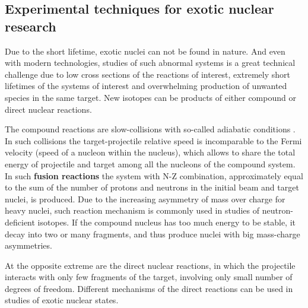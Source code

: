 \subsection{Experimental techniques for exotic nuclear research}

Due to the short lifetime, exotic nuclei can not be found in nature.
And even with modern technologies, studies of such abnormal systems is a great technical challenge due to low cross sections of the reactions of interest, extremely short lifetimes of the systems of interest and overwhelming production of unwanted species in the same target.
New isotopes can be products of either compound or direct nuclear reactions.

The compound reactions are slow-collisions with so-called adiabatic conditions \cite{Zagrebaev:2019}.
In such collisions the target-projectile relative speed is incomparable to the Fermi velocity (speed of a nucleon within the nucleus), which allows to share the total energy of projectile and target among all the nucleons of the compound system.
In such \textbf{fusion reactions} the system with N-Z combination, approximately equal to the sum of the number of protons and neutrons in the initial beam and target nuclei, is produced.
Due to the increasing asymmetry of mass over charge for heavy nuclei, such reaction mechanism is commonly used in studies of neutron-deficient isotopes.
If the compound nucleus has too much energy to be stable, it decay into two or many fragments, and thus produce nuclei with big mass-charge asymmetries.

At the opposite extreme are the direct nuclear reactions, in which the projectile interacts with only few fragments of the target, involving only small number of degrees of freedom.
Different mechanisms of the direct reactions can be used in studies of exotic nuclear states. 

